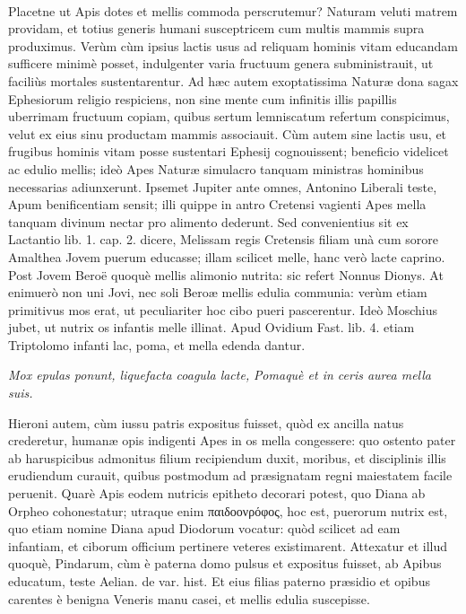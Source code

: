 \documentclass[a4paper, 11pt, oneside, polutonikogreek, latin]{article}
\begin{document}
\paragraph{}
Placetne ut Apis dotes et mellis commoda perscrutemur? Naturam veluti matrem providam, et totius generis humani susceptricem cum multis mammis supra produximus. Verùm cùm ipsius lactis usus ad reliquam hominis vitam educandam sufficere minimè posset, indulgenter varia fructuum genera subministrauit, ut faciliùs mortales sustentarentur. Ad hæc autem exoptatissima Naturæ dona sagax Ephesiorum religio respiciens, non sine mente cum infinitis illis papillis uberrimam fructuum copiam, quibus sertum lemniscatum refertum conspicimus, velut ex eius sinu productam mammis associauit. Cùm autem sine lactis usu, et frugibus hominis vitam posse sustentari Ephesij cognouissent; beneficio videlicet ac edulio mellis; ideò Apes Naturæ simulacro tanquam ministras hominibus necessarias adiunxerunt. Ipsemet Jupiter ante omnes, Antonino Liberali teste, Apum benificentiam sensit; illi quippe in antro Cretensi vagienti Apes mella tanquam divinum nectar pro alimento dederunt. Sed convenientius sit ex Lactantio lib. 1. cap. 2. dicere, Melissam regis Cretensis filiam unà cum sorore Amalthea Jovem puerum educasse; illam scilicet melle, hanc verò lacte caprino. Post Jovem Beroë quoquè mellis alimonio nutrita: sic refert Nonnus Dionys. At enimuerò non uni Jovi, nec soli Beroæ mellis edulia communia: verùm etiam primitivus mos erat, ut peculiariter hoc cibo pueri pascerentur. Ideò Moschius jubet, ut nutrix os infantis melle illinat. Apud Ovidium Fast. lib. 4. etiam Triptolomo infanti lac, poma, et mella edenda dantur.

\emph{Mox epulas ponunt, liquefacta coagula lacte,}
\emph{Pomaquè et in ceris aurea mella suis.}

Hieroni autem, cùm iussu patris expositus fuisset, quòd ex ancilla natus crederetur, humanæ opis indigenti Apes in os mella congessere: quo ostento pater ab haruspicibus admonitus filium recipiendum duxit, moribus, et disciplinis illis erudiendum curauit, quibus postmodum ad præsignatam regni maiestatem facile peruenit. Quarè Apis eodem nutricis epitheto decorari potest, quo Diana ab Orpheo cohonestatur; utraque enim παιδοονρόφος, hoc est, puerorum nutrix est, quo etiam nomine Diana apud Diodorum vocatur: quòd scilicet ad eam infantiam, et ciborum officium pertinere veteres existimarent. Attexatur et illud quoquè, Pindarum, cùm è paterna domo pulsus et expositus fuisset, ab Apibus educatum, teste Aelian. de var. hist. Et eius filias paterno præsidio et opibus carentes è benigna Veneris manu casei, et mellis edulia suscepisse.
\end{document}
